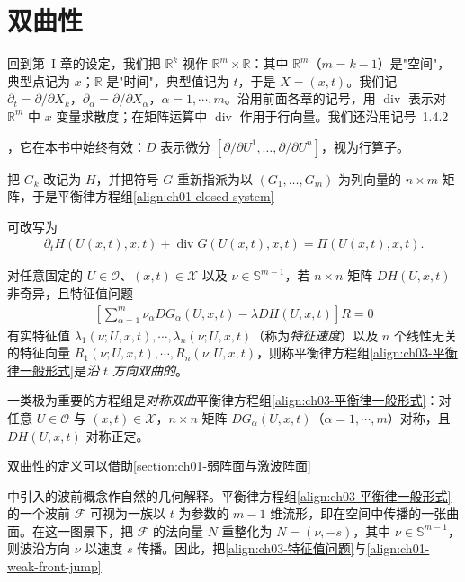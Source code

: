 \documentclass[../../main.tex]{subfiles}
\begin{document}
\section{双曲性}\label{section:ch03-双曲性}

回到第~I 章的设定，我们把 $\mathbb{R}^{k}$ 视作 $\mathbb{R}^{m}\times\mathbb{R}$：其中 $\mathbb{R}^{m}$（$m=k-1$）是"空间"，典型点记为 $x$；$\mathbb{R}$ 是"时间"，典型值记为 $t$，于是 $X=(x,t)$。我们记 $\partial_{t}=\partial/\partial X_{k}$，$\partial_{\alpha}=\partial/\partial X_{\alpha}$，$\alpha=1,\cdots,m$。沿用前面各章的记号，用 $\operatorname{div}$ 表示对 $\mathbb{R}^{m}$ 中 $x$ 变量求散度；在矩阵运算中 $\operatorname{div}$ 作用于行向量。我们还沿用记号~1.4.2%

，它在本书中始终有效：$D$ 表示微分 $[\partial/\partial U^{1},\ldots,\partial/\partial U^{n}]$，视为行算子。

把 $G_{k}$ 改记为 $H$，并把符号 $G$ 重新指派为以 $(G_{1},\ldots,G_{m})$ 为列向量的 $n\times m$ 矩阵，于是平衡律方程组\eqref{align:ch01-closed-system}%

可改写为
\begin{align}
\partial_{t}H(U(x,t),x,t)+\operatorname{div}G(U(x,t),x,t)=\Pi(U(x,t),x,t).
\label{align:ch03-平衡律一般形式}
\end{align}

\begin{definition}[沿 $t$ 方向的双曲性]\label{definition:ch03-沿t方向双曲性}
对任意固定的 $U\in\mathcal{O}$、$(x,t)\in\mathscr{X}$ 以及 $\nu\in\mathbb{S}^{m-1}$，若 $n\times n$ 矩阵 $DH(U,x,t)$ 非奇异，且特征值问题
\begin{align}
\left[\sum_{\alpha=1}^{m}\nu_{\alpha}DG_{\alpha}(U,x,t)-\lambda DH(U,x,t)\right]R=0
\label{align:ch03-特征值问题}
\end{align}
有实特征值 $\lambda_{1}(\nu;U,x,t),\cdots,\lambda_{n}(\nu;U,x,t)$（称为\emph{特征速度}）以及 $n$ 个线性无关的特征向量 $R_{1}(\nu;U,x,t),\cdots,R_{n}(\nu;U,x,t)$，则称平衡律方程组\eqref{align:ch03-平衡律一般形式}是\emph{沿 $t$ 方向双曲的}。
\end{definition}

一类极为重要的方程组是\emph{对称双曲}平衡律方程组\eqref{align:ch03-平衡律一般形式}：对任意 $U\in\mathcal{O}$ 与 $(x,t)\in\mathscr{X}$，$n\times n$ 矩阵 $DG_{\alpha}(U,x,t)$（$\alpha=1,\cdots,m$）对称，且 $DH(U,x,t)$ 对称正定。

双曲性的定义可以借助\cref{section:ch01-弱阵面与激波阵面}%

中引入的波前概念作自然的几何解释。平衡律方程组\eqref{align:ch03-平衡律一般形式}的一个波前 $\mathscr{F}$ 可视为一族以 $t$ 为参数的 $m-1$ 维流形，即在空间中传播的一张曲面。在这一图景下，把 $\mathscr{F}$ 的法向量 $N$ 重整化为 $N=(\nu,-s)$，其中 $\nu\in\mathbb{S}^{m-1}$，则波沿方向 $\nu$ 以速度 $s$ 传播。因此，把\eqref{align:ch03-特征值问题}与\eqref{align:ch01-weak-front-jump}%
\end{document}

